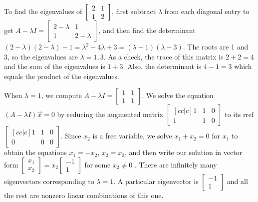 {\begin{example} \label{ex eigen1}
To find the eigenvalues of {$\begin{bmatrix} 2&1\\1&2\end{bmatrix} $}, first subtract $\lambda$ from each diagonal entry to get {$A-\lambda I=\begin{bmatrix} 2-\lambda&1\\1&2-\lambda\end{bmatrix} $}, and then find the determinant {$(2-\lambda)(2-\lambda)-1 = \lambda^2-4\lambda+3=(\lambda-1)(\lambda-3)$}. The roots are 1 and 3, so the eigenvalues are {$\lambda=1,3$}. As a check, the trace of this matrix is $2+2=4$ and the sum of the eigenvalues is $1+3$. Also, the determinant is $4-1=3$ which equals the product of the eigenvalues.  

When {$\lambda=1$}, we compute {$A-\lambda I =\begin{bmatrix} 1&1\\1&1\end{bmatrix} $}. We solve the equation  {$(A-\lambda I )\vec x=0$} by reducing the augmented matrix $\begin{bmatrix}[cc|c] 1&1&0\\1&1&0\end{bmatrix} $ to its rref $\begin{bmatrix}[cc|c] 1&1&0\\0&0&0\end{bmatrix} $. Since $x_2$ is a free variable, we solve $x_1+x_2=0$ for $x_1$ to obtain the equations $x_1=-x_2$, $x_2=x_2$, and then write our solution in vector form 
$\begin{bmatrix} x_1\\x_2\end{bmatrix}= x_2\begin{bmatrix} -1\\1\end{bmatrix}$
 for some {$x_2\neq 0$} . There are infinitely many eigenvectors corresponding to $\lambda=1$. A particular eigenvector is  $\begin{bmatrix} -1\\1\end{bmatrix} $ and all the rest are nonzero linear combinations of this one. 


\end{example}}
